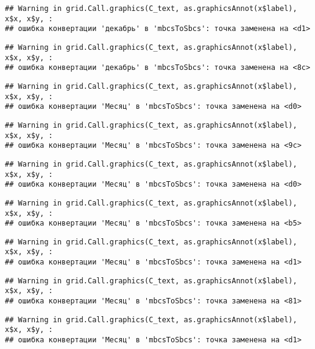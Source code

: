 \documentclass[
]{article}
\begin{document}
\begin{verbatim}
## Warning in grid.Call.graphics(C_text, as.graphicsAnnot(x$label), x$x, x$y, :
## ошибка конвертации 'декабрь' в 'mbcsToSbcs': точка заменена на <d1>
\end{verbatim}

\begin{verbatim}
## Warning in grid.Call.graphics(C_text, as.graphicsAnnot(x$label), x$x, x$y, :
## ошибка конвертации 'декабрь' в 'mbcsToSbcs': точка заменена на <8c>
\end{verbatim}

\begin{verbatim}
## Warning in grid.Call.graphics(C_text, as.graphicsAnnot(x$label), x$x, x$y, :
## ошибка конвертации 'Месяц' в 'mbcsToSbcs': точка заменена на <d0>
\end{verbatim}

\begin{verbatim}
## Warning in grid.Call.graphics(C_text, as.graphicsAnnot(x$label), x$x, x$y, :
## ошибка конвертации 'Месяц' в 'mbcsToSbcs': точка заменена на <9c>
\end{verbatim}

\begin{verbatim}
## Warning in grid.Call.graphics(C_text, as.graphicsAnnot(x$label), x$x, x$y, :
## ошибка конвертации 'Месяц' в 'mbcsToSbcs': точка заменена на <d0>
\end{verbatim}

\begin{verbatim}
## Warning in grid.Call.graphics(C_text, as.graphicsAnnot(x$label), x$x, x$y, :
## ошибка конвертации 'Месяц' в 'mbcsToSbcs': точка заменена на <b5>
\end{verbatim}

\begin{verbatim}
## Warning in grid.Call.graphics(C_text, as.graphicsAnnot(x$label), x$x, x$y, :
## ошибка конвертации 'Месяц' в 'mbcsToSbcs': точка заменена на <d1>
\end{verbatim}

\begin{verbatim}
## Warning in grid.Call.graphics(C_text, as.graphicsAnnot(x$label), x$x, x$y, :
## ошибка конвертации 'Месяц' в 'mbcsToSbcs': точка заменена на <81>
\end{verbatim}

\begin{verbatim}
## Warning in grid.Call.graphics(C_text, as.graphicsAnnot(x$label), x$x, x$y, :
## ошибка конвертации 'Месяц' в 'mbcsToSbcs': точка заменена на <d1>
\end{verbatim}
\end{document}
